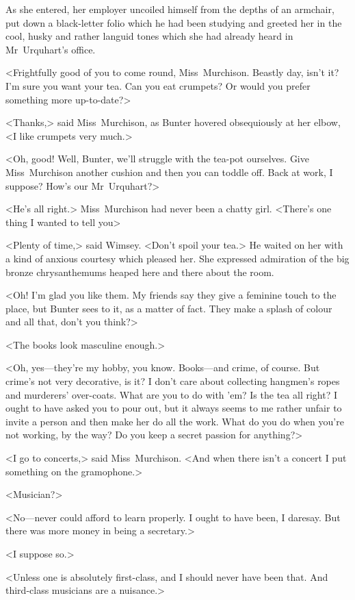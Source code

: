As she entered, her employer uncoiled himself from the depths of an armchair, put down a black-letter folio which he had been studying and greeted her in the cool, husky and rather languid tones which she had already heard in Mr~Urquhart's office.

<Frightfully good of you to come round, Miss~Murchison. Beastly day, isn't it? I'm sure you want your tea. Can you eat crumpets? Or would you prefer something more up-to-date?>

<Thanks,> said Miss~Murchison, as Bunter hovered obsequiously at her elbow, <I like crumpets very much.>

<Oh, good! Well, Bunter, we'll struggle with the tea-pot ourselves. Give Miss~Murchison another cushion and then you can toddle off. Back at work, I suppose? How's our Mr~Urquhart?>

<He's all right.> Miss~Murchison had never been a chatty girl. <There's one thing I wanted to tell you\longdash>

<Plenty of time,> said Wimsey. <Don't spoil your tea.> He waited on her with a kind of anxious courtesy which pleased her. She expressed admiration of the big bronze chrysanthemums heaped here and there about the room.

<Oh! I'm glad you like them. My friends say they give a feminine touch to the place, but Bunter sees to it, as a matter of fact. They make a splash of colour and all that, don't you think?>

<The books look masculine enough.>

<Oh, yes—they're my hobby, you know. Books—and crime, of course. But crime's not very decorative, is it? I don't care about collecting hangmen's ropes and murderers' over-coats. What are you to do with 'em? Is the tea all right? I ought to have asked you to pour out, but it always seems to me rather unfair to invite a person and then make her do all the work. What do you do when you're not working, by the way? Do you keep a secret passion for anything?>

<I go to concerts,> said Miss~Murchison. <And when there isn't a concert I put something on the gramophone.>

<Musician?>

<No—never could afford to learn properly. I ought to have been, I daresay. But there was more money in being a secretary.>

<I suppose so.>

<Unless one is absolutely first-class, and I should never have been that. And third-class musicians are a nuisance.>

